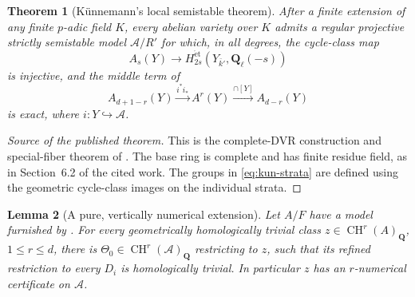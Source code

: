 \documentclass[11pt]{article}
\newtheorem{theorem}{Theorem}[section]
\newtheorem{lemma}[theorem]{Lemma}
\theoremstyle{definition}
\theoremstyle{remark}
\numberwithin{equation}{section}
\newcommand{\CH}{\operatorname{CH}}
\begin{document}
\begin{theorem}[K\"unnemann's local semistable theorem]
\label{thm:kunnemann-local}
After a finite extension of any finite $p$-adic field $K$, every
abelian variety over $K$ admits a regular projective strictly
semistable model $\mathcal A/R'$ for which, in all degrees, the
cycle-class map
\[
 A_s(Y)\longrightarrow
 H^{\mathrm{\acute et}}_{2s}(Y_{\bar k'},\mathbf Q_\ell(-s))
\]
is injective, and the middle term of
\begin{equation}\label{eq:kun-complex}
 A_{d+1-r}(Y)\xrightarrow{i^*i_*} A^r(Y)
                   \xrightarrow{\cap[Y]} A_{d-r}(Y)
\end{equation}
is exact, where $i:Y\hookrightarrow\mathcal A$.
\end{theorem}

\begin{proof}[Source of the published theorem]
This is the complete-DVR construction and special-fiber theorem
of \cite[Theorems~5.6 and~6.6]{Kunnemann}.
The base ring is complete and has finite residue field, as in
Section~6.2 of the cited work.  The groups in
\eqref{eq:kun-strata} are defined using the geometric
cycle-class images on the individual strata.
\end{proof}

\begin{lemma}[A pure, vertically numerical extension]
\label{lem:abelian-lift}
Let $A/F$ have a model furnished by
.  For every geometrically homologically
trivial class $z\in\CH^r(A)_{\mathbf Q}$,
$1\le r\le d$, there is $\Theta_0\in\CH^r(\mathcal A)_{\mathbf Q}$
restricting to $z$, such that its refined restriction to
every $D_i$ is homologically trivial.  In particular $z$ has
an $r$-numerical certificate on $\mathcal A$.
\end{lemma}
\end{document}
